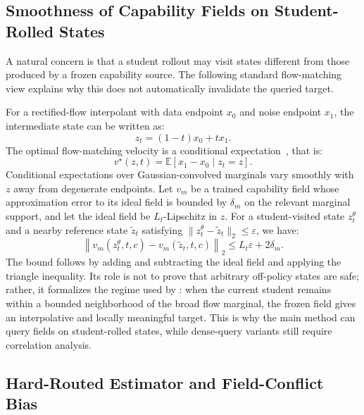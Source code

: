 \vspace{0.2cm}


\subsection{Smoothness of Capability Fields on Student-Rolled States}
\label{app:smoothness}

A natural concern is that a student rollout may visit states different from those produced by a frozen capability source. The following standard flow-matching view explains why this does not automatically invalidate the queried target.

For a rectified-flow interpolant with data endpoint $x_0$ and noise endpoint $x_1$, the intermediate state can be written as:
\begin{equation}
  z_t=(1-t)x_0+t x_1.
\end{equation}
The optimal flow-matching velocity is a conditional expectation~\cite{lipman2022flow}, that is:
\begin{equation}
  v^\star(z,t)=\mathbb{E}\!\left[x_1-x_0 \mid z_t=z\right].
  \label{eq:app-fm-condexp}
\end{equation}
Conditional expectations over Gaussian-convolved marginals vary smoothly with $z$ away from degenerate endpoints. Let $v_m$ be a trained capability field whose approximation error to its ideal field is bounded by $\delta_m$ on the relevant marginal support, and let the ideal field be $L_t$-Lipschitz in $z$. For a student-visited state $z_t^\theta$ and a nearby reference state $\tilde z_t$ satisfying $\|z_t^\theta-\tilde z_t\|_2\le\varepsilon$, we have:
\begin{equation}
  \left\|v_m(z_t^\theta,t,c)-v_m(\tilde z_t,t,c)\right\|_2
  \le L_t\varepsilon+2\delta_m.
  \label{eq:app-teacher-robust}
\end{equation}
The bound follows by adding and subtracting the ideal field and applying the triangle inequality. Its role is not to prove that arbitrary off-policy states are safe; rather, it formalizes the regime used by \name{}: when the current student remains within a bounded neighborhood of the broad flow marginal, the frozen field gives an interpolative and locally meaningful target. This is why the main method can query fields on student-rolled states, while dense-query variants still require correlation analysis.


\vspace{0.2cm}


\subsection{Hard-Routed Estimator and Field-Conflict Bias}
\label{app:hard-routing-math}

